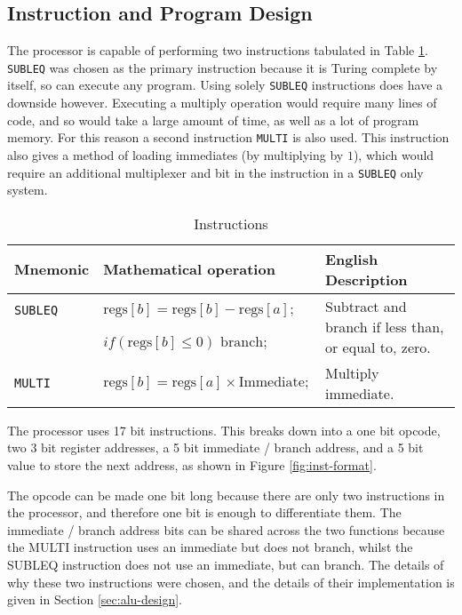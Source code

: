 \subsection{Instruction and Program Design} \label{sec:inst-format}
The processor is capable of performing two instructions tabulated in Table \ref{tbl:insts}. \texttt{SUBLEQ} was chosen as the primary instruction because it is Turing complete by itself, so can execute any program. Using solely \texttt{SUBLEQ} instructions does have a downside however. Executing a multiply operation would require many lines of code, and so would take a large amount of time, as well as a lot of program memory. For this reason a second instruction \texttt{MULTI} is also used. This instruction also gives a method of loading immediates (by multiplying by $1$), which would require an additional multiplexer and bit in the instruction in a \texttt{SUBLEQ} only system.

\begin{table}[ht]

	\centering

	\caption{Instructions}
	\label{tbl:insts}
	\begin{tabular}{l  l l}
		\toprule
		Mnemonic & Mathematical operation & English Description \\
		\midrule
		\texttt{SUBLEQ} & $\text{regs}[b] = \text{regs}[b] - \text{regs}[a];$ & \multirow{2}{0.35\textwidth}{Subtract and branch if less than, or equal to, zero.} \\
		& $if(\text{regs}[b] \leq 0) \text{ branch};$ & \\
		\midrule
		\texttt{MULTI} & $\text{regs}[b] = \text{regs}[a] \times \text{Immediate};$ & Multiply immediate.  \\
		\bottomrule
	\end{tabular}
\end{table}

The processor uses 17 bit instructions. This breaks down into a one bit opcode, two 3 bit register addresses, a 5 bit immediate / branch address, and a 5 bit value to store the next address, as shown in Figure \ref{fig:inst-format}.

The opcode can be made one bit long because there are only two instructions in the processor, and therefore one bit is enough to differentiate them. The immediate / branch address bits can be shared across the two functions because the MULTI instruction uses an immediate but does not branch, whilst the SUBLEQ instruction does not use an immediate, but can branch. The details of why these two instructions were chosen, and the details of their implementation is given in Section \ref{sec:alu-design}.


